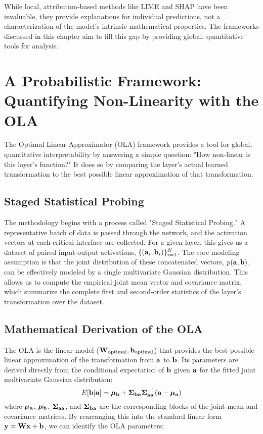 While local, attribution-based methods like LIME and SHAP have been invaluable, they provide explanations for individual predictions, not a characterization of the model's intrinsic mathematical properties. The frameworks discussed in this chapter aim to fill this gap by providing global, quantitative tools for analysis.

\section{A Probabilistic Framework: Quantifying Non-Linearity with the OLA}
\label{sec:ola_framework}

The Optimal Linear Approximator (OLA) framework provides a tool for global, quantitative interpretability by answering a simple question: "How non-linear is this layer's function?" It does so by comparing the layer's actual learned transformation to the best possible linear approximation of that transformation.

\subsection{Staged Statistical Probing}
The methodology begins with a process called "Staged Statistical Probing." A representative batch of data is passed through the network, and the activation vectors at each critical interface are collected. For a given layer, this gives us a dataset of paired input-output activations, $\{(\mathbf{a}_i, \mathbf{b}_i)\}_{i=1}^N$. The core modeling assumption is that the joint distribution of these concatenated vectors, $p(\mathbf{a}, \mathbf{b})$, can be effectively modeled by a single multivariate Gaussian distribution. This allows us to compute the empirical joint mean vector and covariance matrix, which summarize the complete first and second-order statistics of the layer's transformation over the dataset.

\subsection{Mathematical Derivation of the OLA}
The OLA is the linear model ($\mathbf{W}_{\text{optimal}}, \mathbf{b}_{\text{optimal}}$) that provides the best possible linear approximation of the transformation from $\mathbf{a}$ to $\mathbf{b}$. Its parameters are derived directly from the conditional expectation of $\mathbf{b}$ given $\mathbf{a}$ for the fitted joint multivariate Gaussian distribution:
\begin{equation}
E[\mathbf{b}|\mathbf{a}] = \boldsymbol{\mu}_{\mathbf{b}} + \boldsymbol{\Sigma}_{\mathbf{ba}} \boldsymbol{\Sigma}_{\mathbf{aa}}^{-1} (\mathbf{a} - \boldsymbol{\mu}_{\mathbf{a}})
\end{equation}
where $\boldsymbol{\mu}_{\mathbf{a}}$, $\boldsymbol{\mu}_{\mathbf{b}}$, $\boldsymbol{\Sigma}_{\mathbf{aa}}$, and $\boldsymbol{\Sigma}_{\mathbf{ba}}$ are the corresponding blocks of the joint mean and covariance matrices. By rearranging this into the standard linear form $\mathbf{y} = \mathbf{W}\mathbf{x} + \mathbf{b}$, we can identify the OLA parameters:


